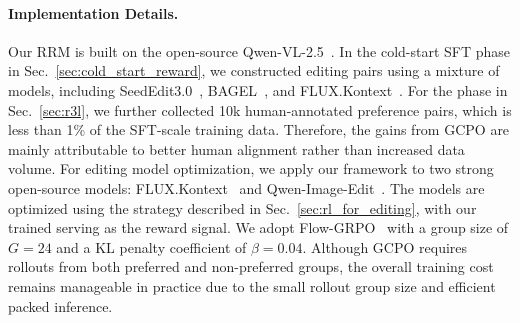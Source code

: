 \paragraph{Implementation Details.}
Our RRM is built on the open-source Qwen-VL-2.5~\citep{bai2025qwen2}.
In the cold-start SFT phase in Sec.~\ref{sec:cold_start_reward}, we constructed editing pairs using a mixture of models, including SeedEdit3.0~\citep{wang2025seededit}, BAGEL~\citep{deng2025emerging}, and FLUX.Kontext~\citep{batifol2025flux}.
For the \gcpo{} phase in Sec.~\ref{sec:r3l}, we further collected 10k human-annotated preference pairs, which is less than 1\% of the SFT-scale training data. Therefore, the gains from GCPO are mainly attributable to better human alignment rather than increased data volume.
For editing model optimization, we apply our \editrone{} framework to two strong open-source models: FLUX.Kontext~\citep{batifol2025flux} and Qwen-Image-Edit~\citep{wu2025qwen}.
The models are optimized using the \grpo{} strategy described in Sec.~\ref{sec:rl_for_editing}, with our trained \rrm{} serving as the reward signal.
We adopt Flow-GRPO~\citep{liu2025flow} with a group size of $G=24$ and a KL penalty coefficient of $\beta=0.04$.
Although GCPO requires rollouts from both preferred and non-preferred groups, the overall training cost remains manageable in practice due to the small rollout group size and efficient packed inference.
